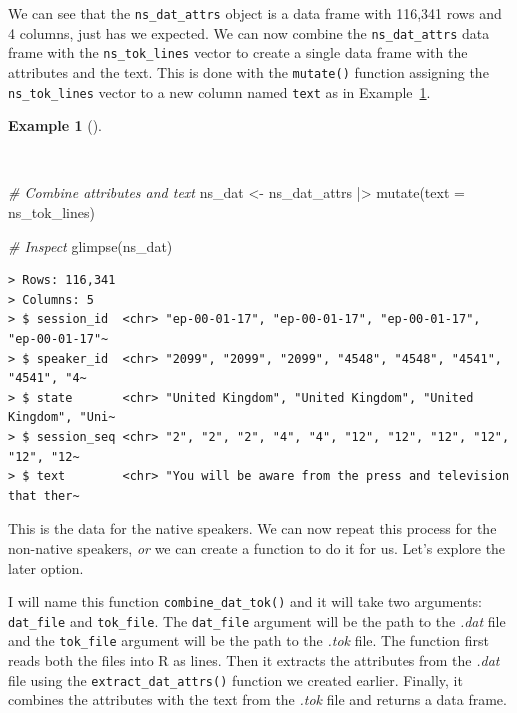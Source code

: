 \documentclass[
  letterpaper,
  DIV=11,
  numbers=noendperiod]{scrreprt}
\newenvironment{Shaded}{\begin{snugshade}}{\end{snugshade}}
\newcommand{\AttributeTok}[1]{\textcolor[rgb]{0.00,0.00,0.00}{#1}}
\newcommand{\CommentTok}[1]{\textcolor[rgb]{0.00,0.00,0.00}{\textit{#1}}}
\newcommand{\FunctionTok}[1]{\textcolor[rgb]{0.00,0.00,0.00}{#1}}
\newcommand{\NormalTok}[1]{\textcolor[rgb]{0.00,0.00,0.00}{#1}}
\newcommand{\OtherTok}[1]{\textcolor[rgb]{0.00,0.00,0.00}{#1}}
\newcommand{\SpecialCharTok}[1]{\textcolor[rgb]{0.00,0.00,0.00}{#1}}
\theoremstyle{definition}
\newtheorem{example}{Example}[chapter]
\theoremstyle{remark}
\begin{document}
We can see that the \texttt{ns\_dat\_attrs} object is a data frame with
116,341 rows and 4 columns, just has we expected. We can now combine the
\texttt{ns\_dat\_attrs} data frame with the \texttt{ns\_tok\_lines}
vector to create a single data frame with the attributes and the text.
This is done with the \texttt{mutate()} function assigning the
\texttt{ns\_tok\_lines} vector to a new column named \texttt{text} as in
Example~\ref{exm-cd-enntt-combine-attributes-text}.

\begin{example}[]\protect\hypertarget{exm-cd-enntt-combine-attributes-text}{}\label{exm-cd-enntt-combine-attributes-text}

~

\begin{Shaded}
\begin{Highlighting}[]
\CommentTok{\# Combine attributes and text}
\NormalTok{ns\_dat }\OtherTok{\textless{}{-}}
\NormalTok{  ns\_dat\_attrs }\SpecialCharTok{|\textgreater{}}
  \FunctionTok{mutate}\NormalTok{(}\AttributeTok{text =}\NormalTok{ ns\_tok\_lines)}

\CommentTok{\# Inspect}
\FunctionTok{glimpse}\NormalTok{(ns\_dat)}
\end{Highlighting}
\end{Shaded}

\begin{verbatim}
> Rows: 116,341
> Columns: 5
> $ session_id  <chr> "ep-00-01-17", "ep-00-01-17", "ep-00-01-17", "ep-00-01-17"~
> $ speaker_id  <chr> "2099", "2099", "2099", "4548", "4548", "4541", "4541", "4~
> $ state       <chr> "United Kingdom", "United Kingdom", "United Kingdom", "Uni~
> $ session_seq <chr> "2", "2", "2", "4", "4", "12", "12", "12", "12", "12", "12~
> $ text        <chr> "You will be aware from the press and television that ther~
\end{verbatim}

\end{example}

This is the data for the native speakers. We can now repeat this process
for the non-native speakers, \emph{or} we can create a function to do it
for us. Let's explore the later option.

I will name this function \texttt{combine\_dat\_tok()} and it will take
two arguments: \texttt{dat\_file} and \texttt{tok\_file}. The
\texttt{dat\_file} argument will be the path to the \emph{.dat} file and
the \texttt{tok\_file} argument will be the path to the \emph{.tok}
file. The function first reads both the files into R as lines. Then it
extracts the attributes from the \emph{.dat} file using the
\texttt{extract\_dat\_attrs()} function we created earlier. Finally, it
combines the attributes with the text from the \emph{.tok} file and
returns a data frame.
\end{document}
